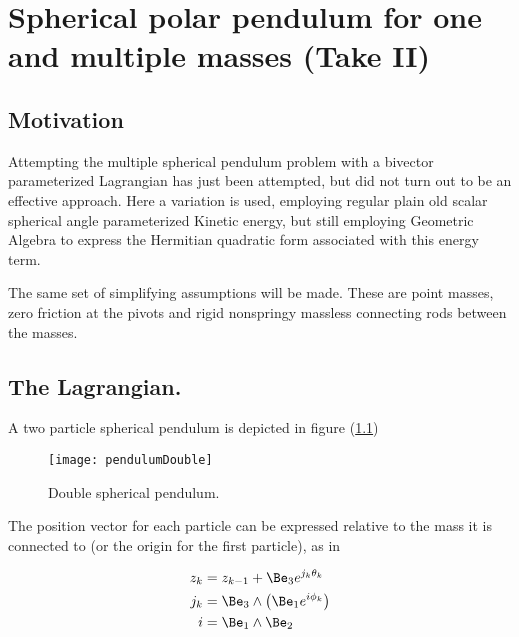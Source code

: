 

\chapter{Spherical polar pendulum for one and multiple masses (Take II)}
\label{chap:multiPendulumSpherical2}
{}
\date{Nov 4, 2009}

\beginArtWithToc

\section{Motivation}

Attempting the multiple spherical pendulum problem with a bivector parameterized Lagrangian has just been attempted, but did not turn out to be an effective approach.  Here a variation is used, employing regular plain old scalar spherical angle parameterized Kinetic energy, but still employing Geometric Algebra to express the Hermitian quadratic form associated with this energy term.

The same set of simplifying assumptions will be made.  These are point masses, zero friction at the pivots and rigid nonspringy massless connecting rods between the masses.

\section{The Lagrangian.}

A two particle spherical pendulum is depicted in figure (\ref{fig:sPolarMultiPendulum:pendulumDouble})

\begin{figure}[htp]
\centering
\texttt{[image: pendulumDouble]}
\caption{Double spherical pendulum.}\label{fig:sPolarMultiPendulum:pendulumDouble}
\end{figure}

The position vector for each particle can be expressed relative to the mass it is connected to (or the origin for the first particle), as in

\begin{align}\label{eqn:multiPendulumSpherical2:boo1}
z_k &= z_{k-1} + \Be_3 e^{j_k \theta_k} \\
j_k &= \Be_3 \wedge \left( \Be_1 e^{i \phi_k} \right) \\
i &= \Be_1 \wedge \Be_2
\end{align}

